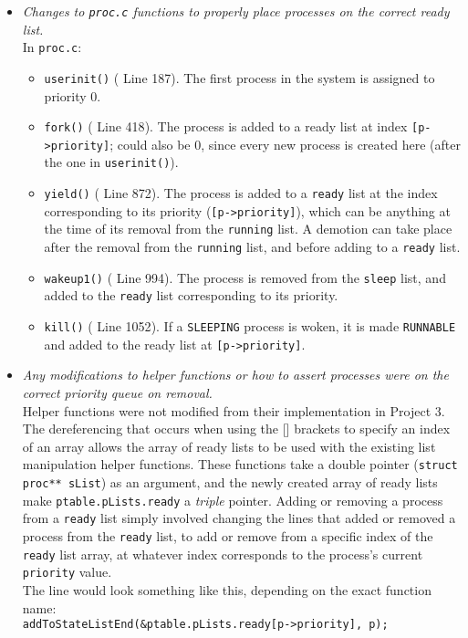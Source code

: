 \documentclass[11pt,letterpaper]{report}
\begin{document}
\begin{itemize}
		\item \emph{Changes to {\tt proc.c} functions to properly place processes on the correct ready list.}\\
		In {\tt proc.c}:
		\begin{itemize}
			\item {\tt userinit()} ({\color{red} Line 187}). The first process in the system is assigned to priority 0.
			\item {\tt fork()} ({\color{red} Line 418}). The process is added to a ready list at index {\tt [p->priority]}; could also be 0, since every new process is created here (after the one in {\tt userinit()}). 
			\item {\tt yield()} ({\color{red} Line 872}). The process is added to a {\tt ready} list at the index corresponding to its priority ({\tt [p->priority]}), which can be anything at the time of its removal from the {\tt running} list. A demotion can take place after the removal from the {\tt running} list, and before adding to a {\tt ready} list.
			\item {\tt wakeup1()} ({\color{red} Line 994}). The process is removed from the {\tt sleep} list, and added to the {\tt ready} list corresponding to its priority.
			\item {\tt kill()} ({\color{red} Line 1052}). If a {\tt SLEEPING} process is woken, it is made {\tt RUNNABLE} and added to the ready list at {\tt [p->priority]}. 
		\end{itemize}
		
		\item \emph{Any modifications to helper functions or how to assert processes were on the correct priority queue on removal.}\\
		Helper functions were not modified from their implementation in Project 3. The dereferencing that occurs when using the [] brackets to specify an index of an array allows the array of ready lists to be used with the existing list manipulation helper functions. These functions take a double pointer ({\tt struct proc** sList}) as an argument, and the newly created array of ready lists make {\tt ptable.pLists.ready} a \emph{triple} pointer. Adding or removing a process from a {\tt ready} list simply involved changing the lines that added or removed a process from the {\tt ready} list, to add or remove from a specific index of the {\tt ready} list array, at whatever index corresponds to the process's current {\tt priority} value.\\
		The line would look something like this, depending on the exact function name:\\
		{\tt addToStateListEnd(\&ptable.pLists.ready[p->priority], p);}\\		
	\end{itemize}
	
\end{document}
